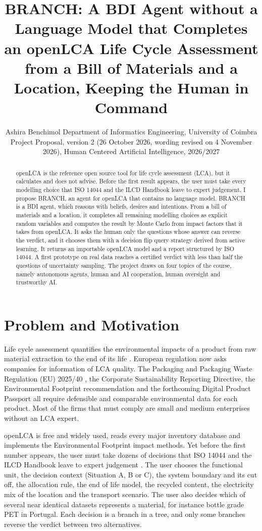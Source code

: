 \documentclass{article}
\title{BRANCH: A BDI Agent without a Language Model that Completes an openLCA Life Cycle Assessment
from a Bill of Materials and a Location, Keeping the Human in Command}
\author{Ashira Benchimol
\affiliations
Department of Informatics Engineering, University of Coimbra\\
Project Proposal, version 2 (26 October 2026, wording revised on 4 November 2026),
Human Centered Artificial Intelligence, 2026/2027}
\begin{document}
\maketitle

\begin{abstract}
openLCA is the reference open source tool for life cycle assessment (LCA), but it calculates and does not
advise. Before the first result appears, the user must take every modelling choice that ISO 14044 and the
ILCD Handbook leave to expert judgement. I propose BRANCH, an agent for openLCA that contains no language
model. BRANCH is a BDI agent, which reasons with beliefs, desires and intentions. From a bill of materials and a location, it completes all remaining modelling
choices as explicit random variables and computes the result by Monte Carlo from impact factors that it
takes from openLCA. It asks the human only the questions whose answer can reverse the verdict, and it
chooses them with a decision flip query strategy derived from active learning. It returns an importable
openLCA model and a report structured by ISO 14044. A first prototype on real data reaches a certified
verdict with less than half the questions of uncertainty sampling. The project draws on four topics of
the course, namely autonomous agents, human and AI cooperation, human oversight and trustworthy AI.
\end{abstract}

\section{Problem and Motivation}
Life cycle assessment quantifies the environmental impacts of a product from raw material extraction to
the end of its life \citep{iso14040}. European regulation now asks companies for information of LCA
quality. The Packaging and Packaging Waste Regulation (EU) 2025/40 \citep{ppwr2024}, the Corporate
Sustainability Reporting Directive, the Environmental Footprint recommendation and the forthcoming Digital
Product Passport all require defensible and comparable environmental data for each product. Most of the
firms that must comply are small and medium enterprises without an LCA expert.

openLCA is free and widely used, reads every major inventory database and implements the Environmental
Footprint impact methods. Yet before the first number appears, the user must take dozens of
decisions that ISO 14044 and the ILCD Handbook leave to expert judgement \citep{ilcd2010,iso14040}. The
user chooses the functional unit, the decision context (Situation A, B or C), the system boundary and its
cut off, the allocation rule, the end of life model, the recycled content, the electricity mix of the
location and the transport scenario. The user also decides which of several near identical datasets
represents a material, for instance bottle grade PET in Portugal. Each decision is a branch in a tree, and only some
branches reverse the verdict between two alternatives.
\end{document}
